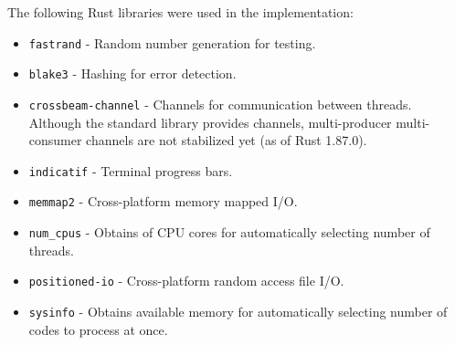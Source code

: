 \label{appendix:dependencies}

The following Rust libraries were used in the implementation:

\begin{itemize}
    \item \texttt{fastrand} - Random number generation for testing.
    \item \texttt{blake3} - Hashing for error detection.
    \item \texttt{crossbeam-channel} - Channels for communication between threads. Although the standard library provides channels, multi-producer multi-consumer channels are not stabilized yet (as of Rust 1.87.0).
    \item \texttt{indicatif} - Terminal progress bars.
    \item \texttt{memmap2} - Cross-platform memory mapped I/O.
    \item \texttt{num\_cpus} - Obtains of CPU cores for automatically selecting number of threads.
    \item \texttt{positioned-io} - Cross-platform random access file I/O.
    \item \texttt{sysinfo} - Obtains available memory for automatically selecting number of codes to process at once.
\end{itemize}

